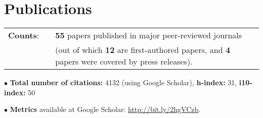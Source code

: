 \documentclass[11pt,letterpaper,sans]{moderncv}
\begin{document}
 \vspace{-0.1cm}
 \vspace{-0.1cm}
 \vspace{-0.1cm}
 \vspace{-0.1cm}

\vspace{-2mm}
\section{Publications}

\cvitem{}
{
\begin{tabular}{rcl}
\textbf{Counts}: &\hspace{0.3cm} &{\textbf{55} papers published in major peer-reviewed journals} \\
& &{(out of which \textbf{12} are first-authored papers, and \textbf{4} papers were covered by press releases).}
\end{tabular}
}

$\bullet$ \textbf{Total number of citations:} 4132 (using Google Scholar), \textbf{h-index:} 31, \textbf{i10-index:} 50

$\bullet$ \textbf{Metrics} available at Google Scholar: {\color{color1} \href{http://bit.ly/2hgVCzb}{http://bit.ly/2hgVCzb}}.
\end{document}
